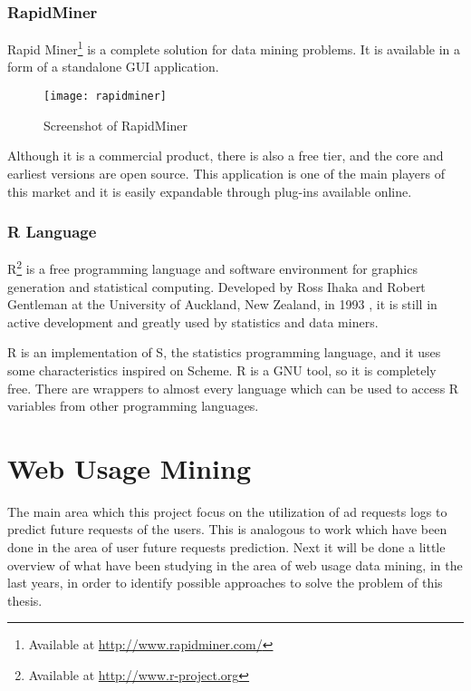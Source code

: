 \subsubsection{RapidMiner}

Rapid Miner\footnote{ Available at \url{http://www.rapidminer.com/}} is a complete solution for data mining problems. It is available in a form of
a standalone GUI application.
\begin{figure}[h]
  \begin{center}
    \leavevmode
    \texttt{[image: rapidminer]}
    \caption{Screenshot of RapidMiner \protect\footnotemark}
    \label{fig:RapidMiner}
  \end{center}
\end{figure}
 Although it is a commercial product, there is also a free tier, and the core and earliest versions are open source. This application
is one of the main players of this market and it is easily expandable through plug-ins available online.

\subsubsection{R Language}
R\footnote{ Available at \url{http://www.r-project.org}} is a free programming language and software environment for graphics generation and statistical computing.
Developed by Ross Ihaka and Robert Gentleman at the University of Auckland, New Zealand, in 1993 \cite{Ihaka98r:past}, it is still in active development and
greatly used by statistics and data miners.

R is an implementation of S, the statistics programming language, and it uses some characteristics inspired on Scheme.
R is a GNU tool, so it is completely free. There are wrappers to almost every language which can be used to access R variables from other programming languages.


\section{Web Usage Mining}\label{sec:network}

\nocite{UjwalaPatil}

The main area which this project focus on the utilization of ad requests logs
to predict future requests of the users. This is analogous to work
which have been done in the area of user future requests prediction.
Next it will be done a little overview of what have been studying in the area of web
usage data mining, in the last years, in order to identify possible approaches
to solve the problem of this thesis.



